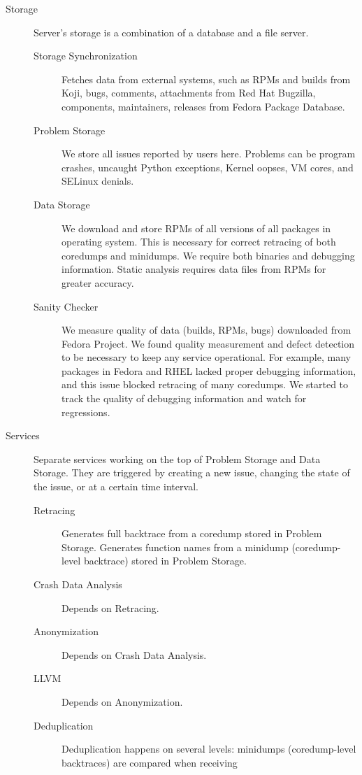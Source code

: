 \documentclass{article}
\begin{document}
\begin{description}
\item[Storage] Server's storage is a combination of a database and a
  file server.
  \begin{description}
  \item[Storage Synchronization] Fetches data from external systems,
    such as RPMs and builds from Koji, bugs, comments, attachments
    from Red Hat Bugzilla, components, maintainers, releases from
    Fedora Package Database.
  \item[Problem Storage] We store all issues reported by users
    here. Problems can be program crashes, uncaught Python exceptions,
    Kernel oopses, VM cores, and SELinux denials.
  \item[Data Storage] We download and store RPMs of all versions of
    all packages in operating system.  This is necessary for correct
    retracing of both coredumps and minidumps.  We require both
    binaries and debugging information.  Static analysis requires data
    files from RPMs for greater accuracy.
  \item[Sanity Checker] We measure quality of data (builds, RPMs,
    bugs) downloaded from Fedora Project.  We found quality
    measurement and defect detection to be necessary to keep any
    service operational.  For example, many packages in Fedora and
    RHEL lacked proper debugging information, and this issue blocked
    retracing of many coredumps.  We started to track the quality of
    debugging information and watch for regressions.
  \end{description}
\item[Services] Separate services working on the top of Problem Storage
  and Data Storage. They are triggered by creating a new issue,
  changing the state of the issue, or at a certain time interval.
  \begin{description}
  \item[Retracing] Generates full backtrace from a coredump stored in
    Problem Storage. Generates function names from a minidump
    (coredump-level backtrace) stored in Problem Storage.
  \item[Crash Data Analysis] Depends on Retracing.
  \item[Anonymization] Depends on Crash Data Analysis.
  \item[LLVM] Depends on Anonymization.
  \item[Deduplication] Deduplication happens on several levels:
    minidumps (coredump-level backtraces) are compared when receiving

\end{description}
\end{description}
\end{document}
